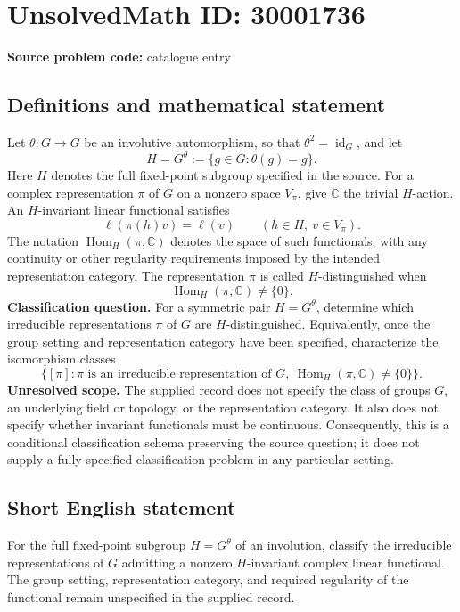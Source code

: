 \documentclass[11pt]{article}
\newcommand{\C}{\mathbb{C}}
\begin{document}
\section*{UnsolvedMath ID: 30001736}
\textbf{Source problem code:} catalogue entry
\subsection{Definitions and mathematical statement}
Let \(\theta\colon G\to G\) be an involutive automorphism, so that \(\theta^2=\operatorname{id}_G\), and let
\[
H=G^\theta:=\{g\in G:\theta(g)=g\}.
\]
Here \(H\) denotes the full fixed-point subgroup specified in the source. For a complex representation \(\pi\) of \(G\) on a nonzero space \(V_\pi\), give \(\C\) the trivial \(H\)-action. An \(H\)-invariant linear functional satisfies
\[
\ell(\pi(h)v)=\ell(v)\qquad(h\in H,\ v\in V_\pi).
\]
The notation \(\operatorname{Hom}_H(\pi,\C)\) denotes the space of such functionals, with any continuity or other regularity requirements imposed by the intended representation category. The representation \(\pi\) is called \(H\)-distinguished when
\[
\operatorname{Hom}_H(\pi,\C)\ne\{0\}.
\]
\textbf{Classification question.} For a symmetric pair \(H=G^\theta\), determine which irreducible representations \(\pi\) of \(G\) are \(H\)-distinguished. Equivalently, once the group setting and representation category have been specified, characterize the isomorphism classes
\[
\bigl\{[\pi]:\pi\text{ is an irreducible representation of }G,
\ \operatorname{Hom}_H(\pi,\C)\ne\{0\}\bigr\}.
\]
\textbf{Unresolved scope.} The supplied record does not specify the class of groups \(G\), an underlying field or topology, or the representation category. It also does not specify whether invariant functionals must be continuous. Consequently, this is a conditional classification schema preserving the source question; it does not supply a fully specified classification problem in any particular setting.
\subsection{Short English statement}
For the full fixed-point subgroup \(H=G^\theta\) of an involution, classify the irreducible representations of \(G\) admitting a nonzero \(H\)-invariant complex linear functional. The group setting, representation category, and required regularity of the functional remain unspecified in the supplied record.
\end{document}
